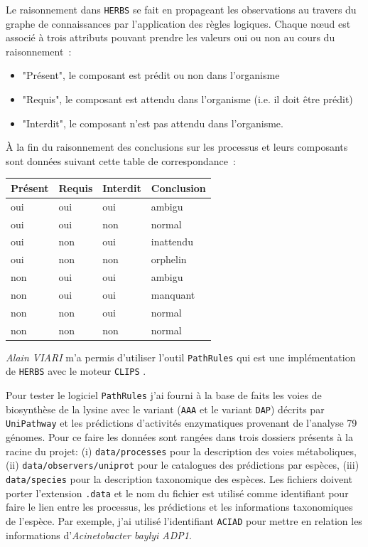 \begin{refsegment}
Le raisonnement dans \texttt{HERBS} se fait en propageant les observations au travers du graphe de connaissances par l’application des règles logiques. Chaque nœud est associé à trois attributs pouvant prendre les valeurs oui ou non au cours du raisonnement :\nolisttopbreak
\begin{itemize}
	\item "Présent", le composant est prédit ou non dans l’organisme
	\item "Requis", le composant est attendu dans l’organisme (i.e. il doit être prédit)
	\item "Interdit", le composant n’est pas attendu dans l’organisme.
\end{itemize}

À la fin du raisonnement des conclusions sur les processus et leurs composants sont données suivant cette table de correspondance :\nolisttopbreak
\begin{table}[H]
	\centering
	\begin{tabular}{|l|l|l|>{\columncolor{LightCyan}}l|}
		\toprule
		\rowcolor{LightCyan}
		\textbf{Présent} & \textbf{Requis} & \textbf{Interdit} & \textbf{Conclusion} \\ 
		\midrule
		oui & oui & oui & ambigu \\ 
		\hline 
		oui & oui & non & normal \\ 
		\hline 
		oui & non & oui & inattendu \\ 
		\hline 
		oui & non & non & orphelin \\ 
		\hline 
		non & oui & oui & ambigu \\ 
		\hline 
		non & oui & oui & manquant \\ 
		\hline 
		non & non & oui & normal \\ 
		\hline 
		non & non & non & normal \\ 
		\bottomrule
	\end{tabular} 
\end{table}

\textit{Alain VIARI} m'a permis d'utiliser l'outil \texttt{PathRules} qui est une implémentation de \texttt{\gls{HERBS}} avec le moteur \texttt{\gls{CLIPS}} \cite{riley1991clips}.


Pour tester le logiciel \texttt{PathRules} j'ai fourni à la base de faits les voies de biosynthèse de la lysine avec le variant (\texttt{AAA} et le variant \texttt{DAP}) décrits par \texttt{UniPathway} et les prédictions d’activités enzymatiques provenant de l’analyse 79 génomes. Pour ce faire les données sont rangées dans trois dossiers présents à la racine du projet: (i) \texttt{data/processes} pour la description des voies métaboliques, (ii) \texttt{data/observers/uniprot} pour le catalogues des prédictions par espèces, (iii) \texttt{data/species} pour la description taxonomique des espèces. Les fichiers doivent porter l'extension \texttt{.data} et le nom du fichier est utilisé comme identifiant pour faire le lien entre les processus, les prédictions et les informations taxonomiques de l'espèce. Par exemple, j'ai utilisé l'identifiant \texttt{ACIAD} pour mettre en relation les informations d'\textit{Acinetobacter baylyi ADP1}.


\end{refsegment}
